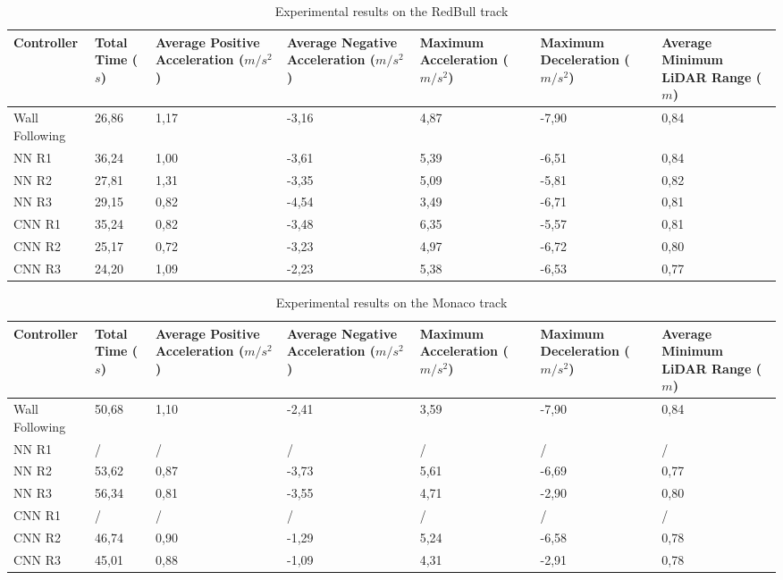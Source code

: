 \begin{table}[H]
\centering
\begin{tabularx}{\textwidth}{||X|X|X|X|X|X|X||} 
\hline
 Controller & Total Time ($s$) & Average Positive Acceleration ($m/s^2$)& Average Negative Acceleration ($m/s^2$) & Maximum Acceleration ($m/s^2$) & Maximum Deceleration ($m/s^2$) & Average Minimum LiDAR Range ($m$)\\ [0.5ex] 
 \hline\hline
Wall Following & 26,86 & 1,17 & -3,16 & 4,87 & -7,90 & 0,84\\[0.5ex] 
 \hline
 NN R1 & 36,24 & 1,00 & -3,61 & 5,39 & -6,51 & 0,84\\[0.5ex] 
 \hline
 NN R2 & 27,81 & 1,31 & -3,35 & 5,09 & -5,81 & 0,82\\[0.5ex] 
 \hline
NN R3 & 29,15 & 0,82 & -4,54 & 3,49 & -6,71 & 0,81\\[0.5ex] 
 \hline
 CNN R1 & 35,24 & 0,82 & -3,48 & 6,35 & -5,57 & 0,81\\[0.5ex] 
 \hline
 CNN R2 & 25,17 & 0,72 & -3,23 & 4,97 & -6,72 & 0,80\\[0.5ex] 
 \hline
 CNN R3 & 24,20 & 1,09 & -2,23 & 5,38 & -6,53 & 0,77\\[0.5ex] 
 \hline
\end{tabularx}
\caption{Experimental results on the RedBull track}
\label{redbull_results}
\end{table}

\begin{table}[H]
\centering
\begin{tabularx}{\textwidth}{||X|X|X|X|X|X|X||} 
\hline
 Controller & Total Time ($s$) & Average Positive Acceleration ($m/s^2$)& Average Negative Acceleration ($m/s^2$) & Maximum Acceleration ($m/s^2$) & Maximum Deceleration ($m/s^2$) & Average Minimum LiDAR Range ($m$)\\ [0.5ex] 
 \hline\hline
Wall Following & 50,68 & 1,10 & -2,41 & 3,59 & -7,90 & 0,84\\[0.5ex] 
 \hline
 NN R1 & / & / & / & / & / & /\\[0.5ex] 
 \hline
 NN R2 & 53,62 & 0,87 & -3,73 & 5,61 & -6,69 & 0,77\\[0.5ex] 
 \hline
NN R3 & 56,34 & 0,81 & -3,55 & 4,71 & -2,90 & 0,80\\[0.5ex] 
 \hline
 CNN R1 & / & / & / & / & / & /\\[0.5ex] 
 \hline
 CNN R2 & 46,74 & 0,90 & -1,29 & 5,24 & -6,58 & 0,78\\[0.5ex] 
 \hline
 CNN R3 & 45,01 & 0,88 & -1,09 & 4,31 & -2,91 & 0,78\\[0.5ex] 
 \hline
\end{tabularx}
\caption{Experimental results on the Monaco track}
\label{monaco_results}
\end{table}


